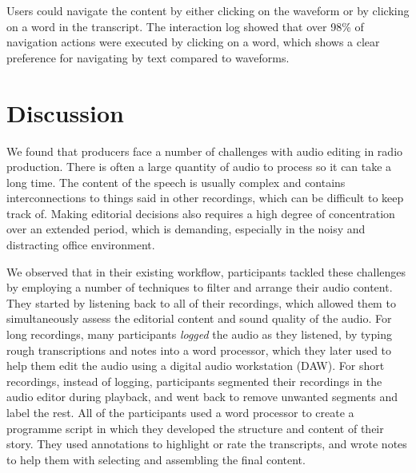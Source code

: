 Users could navigate the content by either clicking on the waveform or by clicking on a word in the transcript. The
interaction log showed that over 98\% of navigation actions were executed by clicking on a word, which shows a clear
preference for navigating by text compared to waveforms.





\section{Discussion}\label{sec:screen-discussion}
We found that producers face a number of challenges with audio editing in radio production. There is often a large
quantity of audio to process so it can take a long time. The content of the speech is usually complex and contains
interconnections to things said in other recordings, which can be difficult to keep track of. Making editorial
decisions also requires a high degree of concentration over an extended period, which is demanding, especially in the
noisy and distracting office environment.

We observed that in their existing workflow, participants tackled these challenges by employing a number of techniques
to filter and arrange their audio content. They started by listening back to all of their recordings, which allowed
them to simultaneously assess the editorial content and sound quality of the audio. For long recordings, many
participants \textit{logged} the audio as they listened, by typing rough transcriptions and notes into a word processor, which
they later used to help them edit the audio using a digital audio workstation (DAW). For short recordings, instead of
logging, participants segmented their recordings in the audio editor during playback, and went back to remove unwanted
segments and label the rest.
All of the participants used a word processor to create a programme script in which they developed the structure and
content of their story. They used annotations to highlight or rate the transcripts, and wrote notes to help them with
selecting and assembling the final content.

